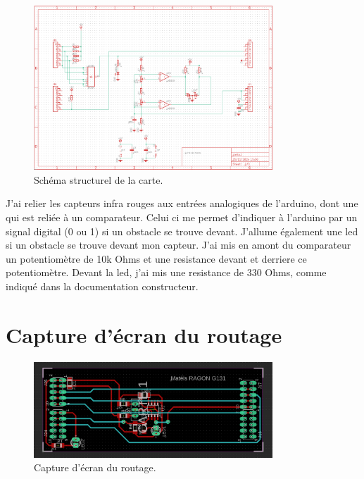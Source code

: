 \documentclass{rapport}
\begin{document}
\begin{figure}[h!]

    \centering


    \includegraphics[width=0.8\textwidth]{src/carte.PNG}

    \caption{Schéma structurel de la carte.}

    \label{fig:structural_diagram}

\end{figure}

J'ai relier les capteurs infra rouges aux entrées analogiques de l'arduino, dont une qui est reliée à un comparateur. Celui ci me permet d'indiquer à l'arduino par un signal digital (0 ou 1) si un obstacle se trouve devant. J'allume également une led si un obstacle se trouve devant mon capteur. J'ai mis en amont du comparateur un potentiomètre de 10k Ohms et une resistance devant et derriere ce potentiomètre. Devant la led, j'ai mis une resistance de 330 Ohms, comme indiqué dans la documentation constructeur.

 

\section{Capture d'écran du routage}

\label{sec:routing}

\begin{figure}[h!]

    \centering


    \includegraphics[width=0.8\textwidth]{src/routage.PNG}

    \caption{Capture d'écran du routage.}

    \label{fig:routing_screenshot}

\end{figure}
\end{document}
